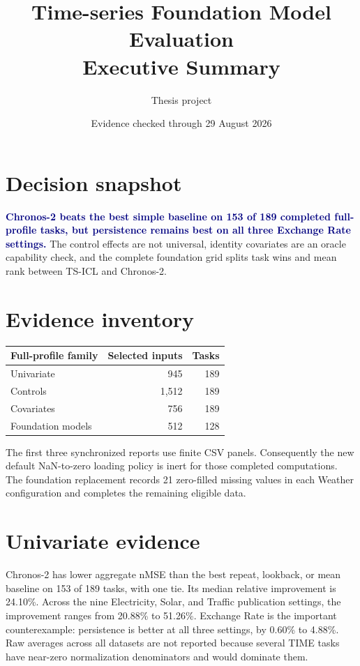 \documentclass[10pt,a4paper]{article}
\title{\textbf{Time-series Foundation Model Evaluation}\\Executive Summary}
\author{Thesis project}
\date{Evidence checked through 29 August 2026}
\begin{document}
\maketitle

\section*{Decision snapshot}
\textcolor{navy}{\textbf{Chronos-2 beats the best simple baseline on 153 of
189 completed full-profile tasks, but persistence remains best on all three
Exchange Rate settings.}}
The control effects are not universal, identity covariates are an oracle
capability check, and the complete foundation grid splits task wins and mean
rank between TS-ICL and Chronos-2.

\section{Evidence inventory}
\begin{center}
\small
\begin{tabularx}{\linewidth}{@{}Yrr@{}}
\toprule
\textbf{Full-profile family} & \textbf{Selected inputs} & \textbf{Tasks} \\
\midrule
Univariate & 945 & 189 \\
Controls & 1,512 & 189 \\
Covariates & 756 & 189 \\
Foundation models & 512 & 128 \\
\bottomrule
\end{tabularx}
\end{center}
The first three synchronized reports use finite CSV panels. Consequently the
new default NaN-to-zero loading policy is inert for those completed
computations. The foundation replacement records 21 zero-filled missing values
in each Weather configuration and completes the remaining eligible data.

\section{Univariate evidence}
Chronos-2 has lower aggregate nMSE than the best repeat, lookback, or mean
baseline on 153 of 189 tasks, with one tie. Its median relative improvement is
24.10\%. Across the nine Electricity, Solar, and Traffic publication settings,
the improvement ranges from 20.88\% to 51.26\%. Exchange Rate is the important
counterexample: persistence is better at all three settings, by 0.60\% to
4.88\%. Raw averages across all datasets are not reported because several TIME
tasks have near-zero normalization denominators and would dominate them.
\end{document}

